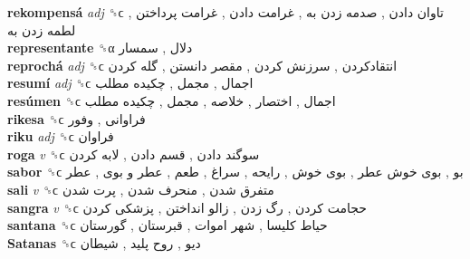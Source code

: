 \textbf{rekompensá} \emph{adj}  ␝ϲ   تاوان دادن ,  صدمه زدن به ,  غرامت دادن ,  غرامت پرداختن ,  لطمه زدن به   \\
\textbf{representante} ␝α   دلال ,  سمسار   \\
\textbf{reprochá} \emph{adj}  ␝ϲ   انتقادکردن ,  سرزنش کردن ,  مقصر دانستن ,  گله کردن   \\
\textbf{resumí} \emph{adj}  ␝ϲ   اجمال ,  مجمل ,  چکیده مطلب   \\
\textbf{resúmen} ␝ϲ   اجمال ,  اختصار ,  خلاصه ,  مجمل ,  چکیده مطلب   \\
\textbf{rikesa} ␝ϲ   فراوانی ,  وفور   \\
\textbf{riku} \emph{adj}  ␝ϲ   فراوان   \\
\textbf{roga} \emph{v}  ␝ϲ   سوگند دادن ,  قسم دادن ,  لابه کردن   \\
\textbf{sabor} ␝ϲ   بو ,  بوی خوش عطر ,  بوی خوش ,  رایحه ,  سراغ ,  طعم ,  عطر و بوی ,  عطر   \\
\textbf{sali} \emph{v}  ␝ϲ   متفرق شدن ,  منحرف شدن ,  پرت شدن   \\
\textbf{sangra} \emph{v}  ␝ϲ   حجامت کردن ,  رگ زدن ,  زالو انداختن ,  پزشکی کردن   \\
\textbf{santana} ␝ϲ   حیاط کلیسا ,  شهر اموات ,  قبرستان ,  گورستان   \\
\textbf{Satanas} ␝ϲ   دیو ,  روح پلید ,  شیطان   \\
